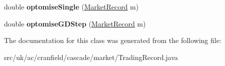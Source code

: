 \begin{DoxyCompactItemize}
\item 
\hypertarget{classuk_1_1ac_1_1cranfield_1_1cascade_1_1market_1_1_trading_record_a942a3ae921af3d6040f84fe4252a5861}{double {\bfseries optomise\-Single} (\hyperlink{classuk_1_1ac_1_1cranfield_1_1cascade_1_1market_1_1_market_record}{Market\-Record} m)}\label{classuk_1_1ac_1_1cranfield_1_1cascade_1_1market_1_1_trading_record_a942a3ae921af3d6040f84fe4252a5861}

\item 
\hypertarget{classuk_1_1ac_1_1cranfield_1_1cascade_1_1market_1_1_trading_record_a96206f4cc2a8f407af44ae4e1eee8a91}{double {\bfseries optomise\-G\-D\-Step} (\hyperlink{classuk_1_1ac_1_1cranfield_1_1cascade_1_1market_1_1_market_record}{Market\-Record} m)}\label{classuk_1_1ac_1_1cranfield_1_1cascade_1_1market_1_1_trading_record_a96206f4cc2a8f407af44ae4e1eee8a91}

\end{DoxyCompactItemize}


The documentation for this class was generated from the following file\-:\begin{DoxyCompactItemize}
\item 
src/uk/ac/cranfield/cascade/market/Trading\-Record.\-java\end{DoxyCompactItemize}
